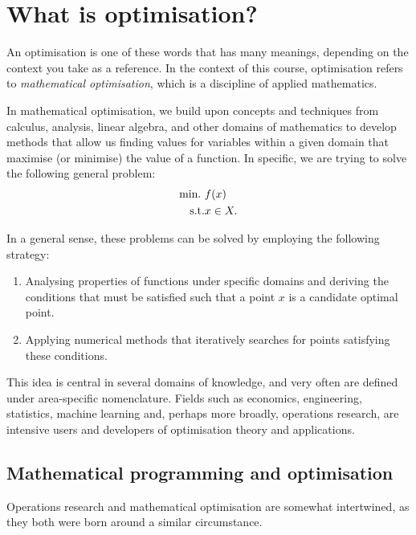 \section{What is optimisation?}

An optimisation is one of these words that has many meanings, depending on the context you take as a reference. In the context of this course, optimisation refers to \emph{mathematical optimisation}, which is a discipline of applied mathematics.

In mathematical optimisation, we build upon concepts and techniques from calculus, analysis, linear algebra, and other domains of mathematics to develop methods that allow us finding values for variables within a given domain that maximise (or minimise) the value of a function. In specific, we are trying to solve the following general problem:
%
\begin{align}
    \mathop{\text{min.~}} & f(x) \label{eq:opt_prob} \\
    \text{s.t.}   &x \in X. \nonumber
\end{align}
%

In a general sense, these problems can be solved by employing the following strategy:
%
\begin{enumerate}
    \item Analysing properties of functions under specific domains and deriving the conditions that must be satisfied such that a point $x$ is a candidate optimal point.
    \item Applying numerical methods that iteratively searches for points satisfying these conditions. 
\end{enumerate}
%
This idea is central in several domains of knowledge, and very often are defined under area-specific nomenclature. Fields such as economics, engineering, statistics, machine learning and, perhaps more broadly, operations research, are intensive users and developers of optimisation theory and applications. 

\subsection{Mathematical programming and optimisation}

Operations research and mathematical optimisation are somewhat intertwined, as they both were born around a similar circumstance. %

